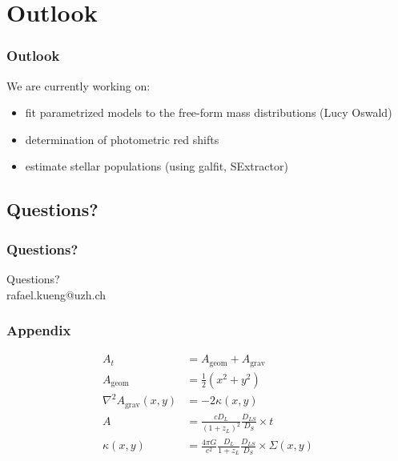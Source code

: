\documentclass{beamer}
\begin{document}
%






\section{Outlook}

\begin{frame}
  \frametitle{Outlook}
  We are currently working on:
  \begin{itemize}
  	\item fit parametrized models to the free-form mass distributions (Lucy Oswald)
    \item determination of photometric red shifts
    \item estimate stellar populations (using galfit, SExtractor)
  \end{itemize}
\end{frame}



\subsection*{Questions?}

\begin{frame}
  \frametitle{Questions?}
  Questions? \\
  rafael.kueng@uzh.ch
\end{frame}




\appendix

\begin{frame}
  \frametitle{Appendix}
\end{frame}

\begin{frame}
  \begin{align}
    A_t &= A_\text{geom} + A_\text{grav}\\
    A_\text{geom} &= \frac{1}{2}\left(x^2+y^2\right)\\
    \nabla^2 A_\text{grav}\left(x,y\right) &= -2\kappa\left(x,y\right)\\
    A           &= \frac{cD_L}{(1+z_L)^2} \frac{D_{LS}}{D_S} \times t \\
    \kappa(x,y) &= \frac{4\pi G}{c^2} \frac{D_L}{1+z_L} \frac{D_{LS}}{D_S} \times \Sigma(x,y)
  \end{align}
  
\end{frame}
\end{document}
